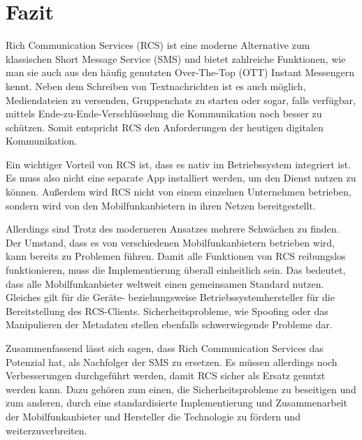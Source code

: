 \documentclass[conference]{IEEEtran}
\begin{document}
\section{Fazit}

Rich Communication Services (RCS) ist eine moderne Alternative zum klassischen Short Message Service (SMS) und bietet zahlreiche Funktionen, wie man sie auch aus den häufig genutzten Over-The-Top (OTT) Instant Messengern kennt.
Neben dem Schreiben von Textnachrichten ist es auch möglich, Mediendateien zu versenden, Gruppenchats zu starten oder sogar, falls verfügbar, mittels Ende-zu-Ende-Verschlüsselung die Kommunikation noch besser zu schützen.
Somit entspricht RCS den Anforderungen der heutigen digitalen Kommunikation.

Ein wichtiger Vorteil von RCS ist, dass es nativ im Betriebssystem integriert ist.
Es muss also nicht eine separate App installiert werden, um den Dienst nutzen zu können.
Außerdem wird RCS nicht von einem einzelnen Unternehmen betrieben, sondern wird von den Mobilfunkanbietern in ihren Netzen bereitgestellt.

Allerdings sind Trotz des moderneren Ansatzes mehrere Schwächen zu finden.
Der Umstand, dass es von verschiedenen Mobilfunkanbietern betrieben wird, kann bereits zu Problemen führen.
Damit alle Funktionen von RCS reibungslos funktionieren, muss die Implementierung überall einheitlich sein.
Das bedeutet, dass alle Mobilfunkanbieter weltweit einen gemeinsamen Standard nutzen.
Gleiches gilt für die Geräte- beziehungsweise Betriebssystemhersteller für die Bereitstellung des RCS-Clients.
Sicherheitsprobleme, wie Spoofing oder das Manipulieren der Metadaten stellen ebenfalls schwerwiegende Probleme dar.

Zusammenfassend lässt sich sagen, dass Rich Communication Services das Potenzial hat, als Nachfolger der SMS zu ersetzen.
Es müssen allerdings noch Verbesserungen durchgeführt werden, damit RCS sicher als Ersatz genutzt werden kann.
Dazu gehören zum einen, die Sicherheitsprobleme zu beseitigen und zum anderen, durch eine standardisierte Implementierung und Zusammenarbeit der Mobilfunkanbieter und Hersteller die Technologie zu fördern und weiterzuverbreiten.



\end{document}
